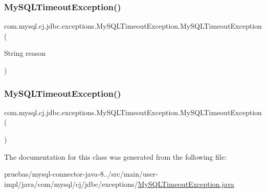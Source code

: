 \subsubsection{\texorpdfstring{My\+S\+Q\+L\+Timeout\+Exception()}{MySQLTimeoutException()}\hspace{0.1cm}{\footnotesize\ttfamily [3/4]}}
{\footnotesize\ttfamily com.\+mysql.\+cj.\+jdbc.\+exceptions.\+My\+S\+Q\+L\+Timeout\+Exception.\+My\+S\+Q\+L\+Timeout\+Exception (\begin{DoxyParamCaption}\item[{String}]{reason }\end{DoxyParamCaption})}

\mbox{\label{classcom_1_1mysql_1_1cj_1_1jdbc_1_1exceptions_1_1_my_s_q_l_timeout_exception_a399941d0a3bc1e7932494656548df7c2}} 
\subsubsection{\texorpdfstring{My\+S\+Q\+L\+Timeout\+Exception()}{MySQLTimeoutException()}\hspace{0.1cm}{\footnotesize\ttfamily [4/4]}}
{\footnotesize\ttfamily com.\+mysql.\+cj.\+jdbc.\+exceptions.\+My\+S\+Q\+L\+Timeout\+Exception.\+My\+S\+Q\+L\+Timeout\+Exception (\begin{DoxyParamCaption}{ }\end{DoxyParamCaption})}



The documentation for this class was generated from the following file\+:\begin{DoxyCompactItemize}
\item 
pruebas/mysql-\/connector-\/java-\/8../src/main/user-\/impl/java/com/mysql/cj/jdbc/exceptions/\mbox{\hyperlink{_my_s_q_l_timeout_exception_8java}{My\+S\+Q\+L\+Timeout\+Exception.\+java}}\end{DoxyCompactItemize}
